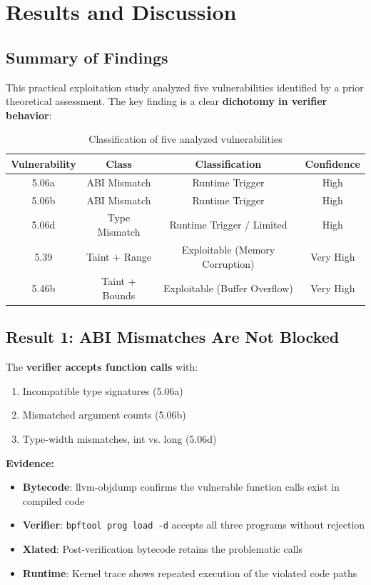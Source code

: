 \chapter{Results and Discussion}
\label{ch:results}

\section{Summary of Findings}

This practical exploitation study analyzed five vulnerabilities identified by a prior theoretical assessment. The key finding is a clear \textbf{dichotomy in verifier behavior}:

\begin{table}[h]
\centering
\begin{tabular}{|c|c|c|c|}
\hline
\textbf{Vulnerability} & \textbf{Class} & \textbf{Classification} & \textbf{Confidence} \\
\hline
5.06a & ABI Mismatch & Runtime Trigger & High \\
5.06b & ABI Mismatch & Runtime Trigger & High \\
5.06d & Type Mismatch & Runtime Trigger / Limited & High \\
5.39 & Taint + Range & Exploitable (Memory Corruption) & Very High \\
5.46b & Taint + Bounds & Exploitable (Buffer Overflow) & Very High \\
\hline
\end{tabular}
\caption{Classification of five analyzed vulnerabilities}
\end{table}

\section{Result 1: ABI Mismatches Are Not Blocked}

The \textbf{verifier accepts function calls} with:
\begin{enumerate}[label=\arabic*.]
  \item Incompatible type signatures (5.06a)
  \item Mismatched argument counts (5.06b)
  \item Type-width mismatches, int vs. long (5.06d)
\end{enumerate}

\textbf{Evidence:}
\begin{itemize}
  \item \textbf{Bytecode}: llvm-objdump confirms the vulnerable function calls exist in compiled code
  \item \textbf{Verifier}: \texttt{bpftool prog load -d} accepts all three programs without rejection
  \item \textbf{Xlated}: Post-verification bytecode retains the problematic calls
  \item \textbf{Runtime}: Kernel trace shows repeated execution of the violated code paths
\end{itemize}

